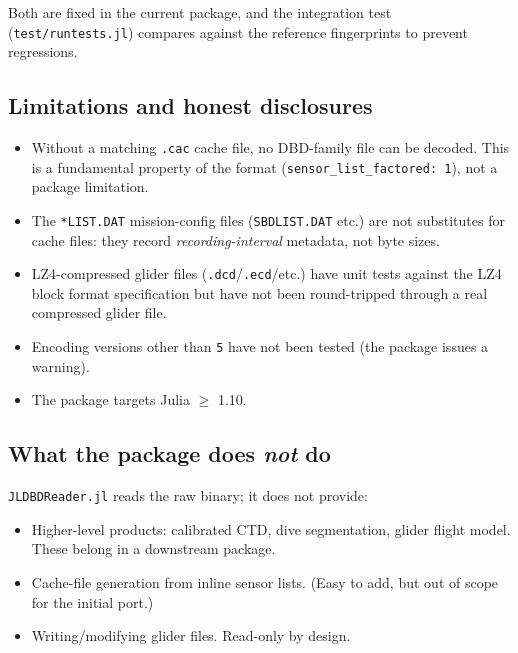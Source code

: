 \documentclass[11pt]{article}
\begin{document}
Both are fixed in the current package, and the integration test
(\texttt{test/runtests.jl}) compares against the reference fingerprints to
prevent regressions.

\subsection{Limitations and honest disclosures}

\begin{itemize}[leftmargin=*,topsep=1pt,itemsep=0pt]
  \item Without a matching \texttt{.cac} cache file, no DBD-family file can
        be decoded.  This is a fundamental property of the format
        (\texttt{sensor\_list\_factored: 1}), not a package limitation.
  \item The \texttt{*LIST.DAT} mission-config files (\texttt{SBDLIST.DAT}
        etc.) are not substitutes for cache files: they record
        \emph{recording-interval} metadata, not byte sizes.
  \item LZ4-compressed glider files (\texttt{.dcd}/\texttt{.ecd}/etc.) have
        unit tests against the LZ4 block format specification but have not
        been round-tripped through a real compressed glider file.
  \item Encoding versions other than \texttt{5} have not been tested
        (the package issues a warning).
  \item The package targets Julia $\geq$ 1.10.
\end{itemize}

\subsection{What the package does \emph{not} do}

\texttt{JLDBDReader.jl} reads the raw binary; it does not provide:
\begin{itemize}[leftmargin=*,topsep=1pt,itemsep=0pt]
  \item Higher-level products: calibrated CTD, dive segmentation, glider
        flight model.  These belong in a downstream package.
  \item Cache-file generation from inline sensor lists.  (Easy to add, but
        out of scope for the initial port.)
  \item Writing/modifying glider files.  Read-only by design.
\end{itemize}
\end{document}

